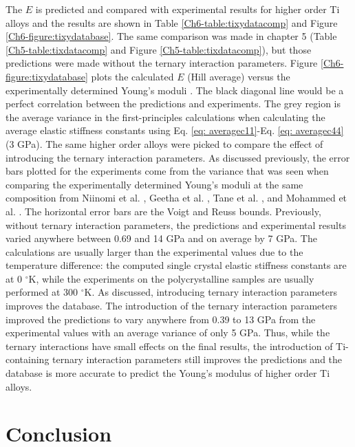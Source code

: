 The $E$ is predicted and compared with experimental results for higher order Ti alloys and the results are shown in Table \ref{Ch6-table:tixydatacomp} and Figure \ref{Ch6-figure:tixydatabase}. The same comparison was made in chapter 5 (Table \ref{Ch5-table:tixdatacomp} and Figure \ref{Ch5-table:tixdatacomp}), but those predictions were made without the ternary interaction parameters. Figure \ref{Ch6-figure:tixydatabase} plots the calculated $E$ (Hill average) versus the experimentally determined Young's moduli \cite{Tane2010a,Mohammed2014,Geetha2009}. The black diagonal line would be a perfect correlation between the predictions and experiments. The grey region is the average variance in the first-principles calculations when calculating the average elastic stiffness constants using Eq. \ref{eq: averagec11}-Eq. \ref{eq: averagec44} (3 GPa). The same higher order alloys were picked to compare the effect of introducing the ternary interaction parameters. As discussed previously, the error bars plotted for the experiments come from the variance that was seen when comparing the experimentally determined Young's moduli at the same composition from Niinomi et al. \cite{Niinomi2012}, Geetha et al. \cite{Geetha2009}, Tane et al. \cite{Tane2010a}, and Mohammed et al. \cite{Mohammed2014}. The horizontal error bars are the Voigt and Reuss bounds. Previously, without ternary interaction parameters, the predictions and experimental results varied anywhere between 0.69 and 14 GPa and on average by 7 GPa. The calculations are usually larger than the experimental values due to the temperature difference: the computed single crystal elastic stiffness constants are at 0 $^{\circ}$K, while the experiments on the polycrystalline samples are usually performed at 300 $^{\circ}$K. As discussed, introducing ternary interaction parameters improves the database. The introduction of the ternary interaction parameters improved the predictions to vary anywhere from 0.39 to 13 GPa from the experimental values with an average variance of only 5 GPa. Thus, while the ternary interactions have small effects on the final results, the introduction of Ti-containing ternary interaction parameters still improves the predictions and the database is more accurate to predict the Young's modulus of higher order Ti alloys. 

\section{Conclusion}

